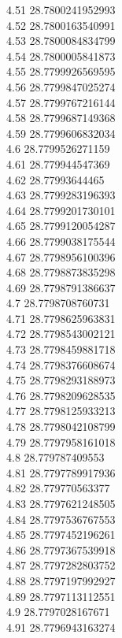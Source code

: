 {4.51	28.7800241952993\\
4.52	28.7800163540991\\
4.53	28.7800084834799\\
4.54	28.7800005841873\\
4.55	28.7799926569595\\
4.56	28.7799847025274\\
4.57	28.7799767216144\\
4.58	28.7799687149368\\
4.59	28.7799606832034\\
4.6	28.7799526271159\\
4.61	28.779944547369\\
4.62	28.77993644465\\
4.63	28.7799283196393\\
4.64	28.7799201730101\\
4.65	28.7799120054287\\
4.66	28.7799038175544\\
4.67	28.7798956100396\\
4.68	28.7798873835298\\
4.69	28.7798791386637\\
4.7	28.7798708760731\\
4.71	28.7798625963831\\
4.72	28.7798543002121\\
4.73	28.7798459881718\\
4.74	28.7798376608674\\
4.75	28.7798293188973\\
4.76	28.7798209628535\\
4.77	28.7798125933213\\
4.78	28.7798042108799\\
4.79	28.7797958161018\\
4.8	28.779787409553\\
4.81	28.7797789917936\\
4.82	28.779770563377\\
4.83	28.7797621248505\\
4.84	28.7797536767553\\
4.85	28.7797452196261\\
4.86	28.7797367539918\\
4.87	28.7797282803752\\
4.88	28.7797197992927\\
4.89	28.7797113112551\\
4.9	28.7797028167671\\
4.91	28.7796943163274\\
}
